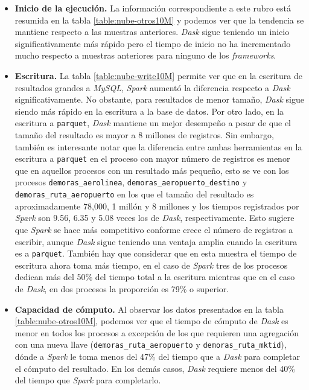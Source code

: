 \begin{itemize}
	\item \textbf{Inicio de la ejecución.} La información correspondiente a este rubro está resumida en la tabla \ref{table:nube-otros10M} y podemos ver que la tendencia se mantiene respecto a las muestras anteriores. \textit{Dask} sigue teniendo un inicio significativamente más rápido pero el tiempo de inicio no ha incrementado mucho respecto a muestras anteriores para ninguno de los \textit{frameworks}.
	
	\item \textbf{Escritura.} La tabla \ref{table:nube-write10M} permite ver que en la escritura de resultados grandes a \textit{MySQL}, \textit{Spark} aumentó la diferencia respecto a \textit{Dask} significativamente. No obstante, para resultados de menor tamaño, \textit{Dask} sigue siendo más rápido en la escritura a la base de datos. Por otro lado, en la escritura a \texttt{parquet}, \textit{Dask} mantiene un mejor desempeño a pesar de que el tamaño del resultado es mayor a 8 millones de registros. Sin embargo, también es interesante notar que la diferencia entre ambas herramientas en la escritura a \texttt{parquet} en el proceso con mayor número de registros es menor que en aquellos procesos con un resultado más pequeño, esto se ve con los procesos  \texttt{demoras\_aerolinea}, \texttt{demoras\_aeropuerto\_destino} y \texttt{demoras\_ruta\_aeropuerto} en los que el tamaño del resultado es aproximadamente 78,000, 1 millón y 8 millones y los tiempos registrados por \textit{Spark} son 9.56, 6.35 y 5.08 veces los de \textit{Dask}, respectivamente. Esto sugiere que \textit{Spark} se hace más competitivo conforme crece el número de registros a escribir, aunque \textit{Dask} sigue teniendo una ventaja amplia cuando la escritura es a \texttt{parquet}. También hay que considerar que en esta muestra el tiempo de escritura ahora toma más tiempo, en el caso de \textit{Spark} tres de los procesos dedican más del 50\% del tiempo total a la escritura mientras que en el caso de \textit{Dask}, en dos procesos la proporción es 79\% o superior.
	
	\item \textbf{Capacidad de cómputo.} Al observar los datos presentados en la tabla \ref{table:nube-otros10M}, podemos ver que el tiempo de cómputo de \textit{Dask} es menor en todos los procesos a excepción de los que requieren una agregación con una nueva llave (\texttt{demoras\_ruta\_aeropuerto} y \texttt{demoras\_ruta\_mktid}), dónde a \textit{Spark} le toma menos del 47\% del tiempo que a \textit{Dask} para completar el cómputo del resultado. En los demás casos, \textit{Dask} requiere menos del 40\% del tiempo que \textit{Spark} para completarlo. 
	

\end{itemize}
